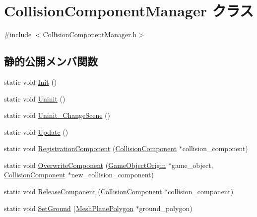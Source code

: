 \hypertarget{class_collision_component_manager}{}\section{Collision\+Component\+Manager クラス}
\label{class_collision_component_manager}


{\ttfamily \#include $<$Collision\+Component\+Manager.\+h$>$}

\subsection*{静的公開メンバ関数}
\begin{DoxyCompactItemize}
\item 
static void \mbox{\hyperlink{class_collision_component_manager_ad3cdee51a184eaf784629d2f77e61887}{Init}} ()
\item 
static void \mbox{\hyperlink{class_collision_component_manager_ab885e530bc38f492a0c0b146933cea0c}{Uninit}} ()
\item 
static void \mbox{\hyperlink{class_collision_component_manager_a9701404b478f57134e73c2a2abd89820}{Uninit\+\_\+\+Change\+Scene}} ()
\item 
static void \mbox{\hyperlink{class_collision_component_manager_acdcc5f9fd7013c03b7626e821ea5e396}{Update}} ()
\item 
static void \mbox{\hyperlink{class_collision_component_manager_abe3a5c6f3753e663b22124ff357317ac}{Registration\+Component}} (\mbox{\hyperlink{class_collision_component}{Collision\+Component}} $\ast$collision\+\_\+component)
\item 
static void \mbox{\hyperlink{class_collision_component_manager_a728423faf3bacb0808f2d08411b12503}{Overwrite\+Component}} (\mbox{\hyperlink{class_game_object_origin}{Game\+Object\+Origin}} $\ast$game\+\_\+object, \mbox{\hyperlink{class_collision_component}{Collision\+Component}} $\ast$new\+\_\+collision\+\_\+component)
\item 
static void \mbox{\hyperlink{class_collision_component_manager_a3ef5f5689d8d1a008a6eafc406da57c5}{Release\+Component}} (\mbox{\hyperlink{class_collision_component}{Collision\+Component}} $\ast$collision\+\_\+component)
\item 
static void \mbox{\hyperlink{class_collision_component_manager_a5cd51c83da7658cd8172aa94bfb37ceb}{Set\+Ground}} (\mbox{\hyperlink{class_mesh_plane_polygon}{Mesh\+Plane\+Polygon}} $\ast$ground\+\_\+polygon)
\end{DoxyCompactItemize}
